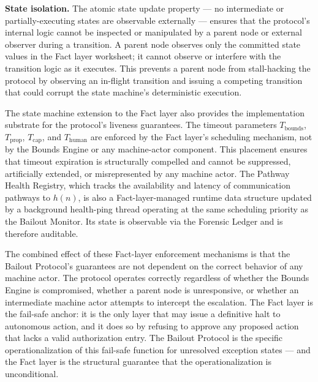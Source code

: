 \textbf{State isolation.} The atomic state update property — no intermediate or
partially-executing states are observable externally — ensures that the protocol's
internal logic cannot be inspected or manipulated by a parent node or external
observer during a transition.  A parent node observes only the committed state
values in the Fact layer worksheet; it cannot observe or interfere with the
transition logic as it executes.  This prevents a parent node from stall-hacking
the protocol by observing an in-flight transition and issuing a competing
transition that could corrupt the state machine's deterministic execution.

The state machine extension to the Fact layer also provides the implementation
substrate for the protocol's liveness guarantees.  The timeout parameters
$T_{\text{bounds}}$, $T_{\text{prop}}$, $T_{\text{cap}}$, and $T_{\text{human}}$
are enforced by the Fact layer's scheduling mechanism, not by the Bounds Engine
or any machine-actor component.  This placement ensures that timeout expiration
is structurally compelled and cannot be suppressed, artificially extended, or
misrepresented by any machine actor.  The Pathway Health Registry, which tracks
the availability and latency of communication pathways to $h(n)$, is also a
Fact-layer-managed runtime data structure updated by a background health-ping
thread operating at the same scheduling priority as the Bailout Monitor.  Its
state is observable via the Forensic Ledger and is therefore auditable.

The combined effect of these Fact-layer enforcement mechanisms is that the
Bailout Protocol's guarantees are not dependent on the correct behavior of
any machine actor.  The protocol operates correctly regardless of whether the
Bounds Engine is compromised, whether a parent node is unresponsive, or whether
an intermediate machine actor attempts to intercept the escalation.  The Fact
layer is the fail-safe anchor: it is the only layer that may issue a definitive
halt to autonomous action, and it does so by refusing to approve any proposed
action that lacks a valid authorization entry.  The Bailout Protocol is the
specific operationalization of this fail-safe function for unresolved exception
states — and the Fact layer is the structural guarantee that the operationalization
is unconditional.